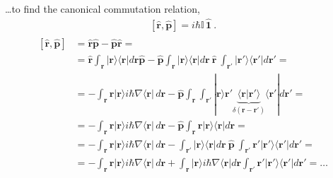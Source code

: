 \documentclass[letterpaper,10pt,english]{jupyterBook}
\begin{document}
\sphinxAtStartPar
…to find the canonical commutation relation,
\begin{equation*}
\begin{split}[ \hat{\mathbf{r}}, \hat{\mathbf{p}} ] = i \hbar  \mathbb{I} \, \hat{\mathbf{1}} \ .\end{split}
\end{equation*}\begin{equation*}
\begin{split}\begin{aligned}
\left[ \hat{\mathbf{r}}, \hat{\mathbf{p}} \right]
 & = \hat{\mathbf{r}} \hat{\mathbf{p}} - \hat{\mathbf{p}} \hat{\mathbf{r}} = \\
 & = \hat{\mathbf{r}} \int_{\mathbf{r}} | \mathbf{r} \rangle \langle \mathbf{r} | d \mathbf{r} \hat{\mathbf{p}}
   - \hat{\mathbf{p}} \int_{\mathbf{r}} | \mathbf{r} \rangle \langle \mathbf{r} | d \mathbf{r} \ \hat{\mathbf{r}} \ \int_{\mathbf{r}'} | \mathbf{r}' \rangle \langle \mathbf{r}' | d \mathbf{r}' = \\
 & = - \int_{\mathbf{r}} \mathbf{r} | \mathbf{r} \rangle i \hbar \nabla \langle \mathbf{r} | \, d \mathbf{r} - \hat{\mathbf{p}} \int_{\mathbf{r}} \int_{\mathbf{r}'} | \mathbf{r} \rangle \mathbf{r}' \underbrace{\langle \mathbf{r} |\mathbf{r}' \rangle}_{\delta(\mathbf{r}-\mathbf{r}')} \langle \mathbf{r}' | d \mathbf{r}' = \\
 & = - \int_{\mathbf{r}} \mathbf{r} | \mathbf{r} \rangle i \hbar \nabla \langle \mathbf{r} | \, d \mathbf{r} - \hat{\mathbf{p}} \int_{\mathbf{r}} \mathbf{r} | \mathbf{r} \rangle \langle \mathbf{r} | d \mathbf{r} = \\
 & = - \int_{\mathbf{r}} \mathbf{r} | \mathbf{r} \rangle i \hbar \nabla \langle \mathbf{r} | \, d \mathbf{r} - \int_{\mathbf{r}'} | \mathbf{r} \rangle \langle \mathbf{r} | d \mathbf{r} \ \hat{\mathbf{p}} \ \int_{\mathbf{r}'} \mathbf{r}' | \mathbf{r}' \rangle \langle \mathbf{r}' | d \mathbf{r}' = \\
 & = - \int_{\mathbf{r}} \mathbf{r} | \mathbf{r} \rangle i \hbar \nabla \langle \mathbf{r} | \, d \mathbf{r} + \int_{\mathbf{r}} | \mathbf{r} \rangle i \hbar \nabla \langle \mathbf{r} | d \mathbf{r} \int_{\mathbf{r}'} \mathbf{r}' | \mathbf{r}' \rangle \langle \mathbf{r}' | d \mathbf{r}' = \dots
\end{aligned}\end{split}
\end{equation*}\begin{equation*}
\begin{split}\begin{aligned}

\end{aligned}
\end{split}
\end{equation*}
\end{document}
